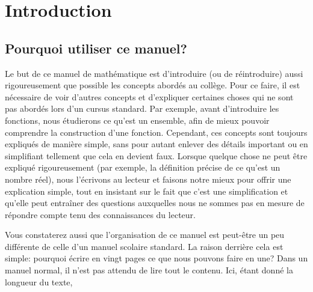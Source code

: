 \chapter*{Introduction}

\setlength{\parindent}{4em}


\section*{Pourquoi utiliser ce manuel?}

\noindent Le but de ce manuel de mathématique est d'introduire (ou de réintroduire) aussi rigoureusement que possible les concepts abordés au collège. Pour ce faire, il est nécessaire de voir d'autres concepts et d'expliquer certaines choses qui ne sont pas abordés lors d'un cursus standard. Par exemple, avant d'introduire les fonctions, nous étudierons ce qu'est un ensemble, afin de mieux pouvoir comprendre la construction d'une fonction. Cependant, ces concepts sont toujours expliqués de manière simple, sans pour autant enlever des détails important ou en simplifiant tellement que cela en devient faux. Lorsque quelque chose ne peut être expliqué rigoureusement (par exemple, la définition précise de ce qu'est un nombre réel), nous l'écrivons au lecteur et faisons notre mieux pour offrir une explication simple, tout en insistant sur le fait que c'est une simplification et qu'elle peut entraîner des questions auxquelles nous ne sommes pas en mesure de répondre compte tenu des connaissances du lecteur.

Vous constaterez aussi que l'organisation de ce manuel est peut-être un peu différente de celle d'un manuel scolaire standard. La raison derrière cela est simple: pourquoi écrire en vingt pages ce que nous pouvons faire en une? Dans un manuel normal, il n'est pas attendu de lire tout le contenu. Ici, étant donné la longueur du texte,

\setlength{\parindent}{0em}